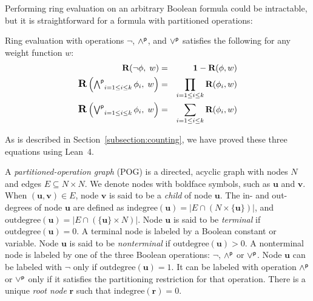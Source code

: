 \documentclass[letterpaper,USenglish,cleveref, autoref, thm-restate]{lipics-v2021}
\newcommand{\pand}{\mathbin{\land^{\sf p}}}
\newcommand{\por}{\mathbin{\lor^{\sf p}}}
\DeclareMathOperator*{\Pand}{\bigwedge^{\sf p}}
\DeclareMathOperator*{\Por}{\bigvee^{\sf p}}
\newcommand{\boolnot}{\neg}
\newcommand{\rep}{\textbf{R}}
\newcommand{\mulident}{\textbf{1}}
\newcommand{\indegree}{\textrm{indegree}}
\newcommand{\outdegree}{\textrm{outdegree}}
\newcommand{\makenode}[1]{\mathbf{#1}}
\newcommand{\nodeu}{\makenode{u}}
\newcommand{\nodev}{\makenode{v}}
\newcommand{\noder}{\makenode{r}}
\newcommand{\lean}{Lean~4}
\begin{document}
Performing ring evaluation on an arbitrary Boolean formula could be intractable, but it is straightforward for a formula with partitioned operations:
\begin{proposition}
\label{prop:ring:eval}
Ring evaluation with operations $\boolnot$, $\pand$, and $\por$ satisfies the following for any weight function $w$:
\begin{eqnarray}
\textstyle
\rep(\boolnot \phi,\; w) &=& \mulident - \rep(\phi, w) \label{eqn:ring:negation} \\
\textstyle
\scalebox{1.2}{\rep}\left(\Pand_{i=1 \leq i \leq k} \phi_i,\; w \right) &=& \prod_{i=1 \leq i \leq k} \rep(\phi_i, w) \label{eqn:ring:product} \\
\textstyle
\scalebox{1.2}{\rep}\left(\Por_{i=1 \leq i \leq k} \phi_i,\; w\right) &=& \sum_{i=1 \leq i \leq k} \rep(\phi_i, w) \label{eqn:ring:sum}
\end{eqnarray}
\end{proposition}
As is described in Section~\ref{subsection:counting}, we have proved these three equations using \lean{}.

A {\em partitioned-operation graph} (POG) is a directed, acyclic graph
with nodes $N$ and edges $E \subseteq N \times N$.  We denote nodes with boldface symbols, such as $\nodeu$ and $\nodev$.
When $(\nodeu,\nodev) \in E$,
node $\nodev$ is said to be a {\em child} of node $\nodeu$.
The in- and out-degrees of node $\nodeu$ are defined as $\indegree(\nodeu) = | E \cap (N \times \{\nodeu\}) |$, and
$\outdegree(\nodeu) = | E \cap (\{\nodeu\} \times N) |$.
Node $\nodeu$ is said to be {\em terminal} if $\outdegree(\nodeu) = 0$.  A terminal node is labeled by a Boolean constant or variable.
Node $\nodeu$ is said to be {\em nonterminal} if $\outdegree(\nodeu) > 0$.
A nonterminal node is labeled by one of the three Boolean operations: $\boolnot$, $\pand$ or $\por$.
Node $\nodeu$ can be labeled with $\boolnot$ only if $\outdegree(\nodeu) = 1$.
It can be labeled with operation $\pand$ or $\por$ only if it satisfies the partitioning restriction for that operation.
There is a unique {\em root node} $\noder$ such that $\indegree(\noder) = 0$.
\end{document}

